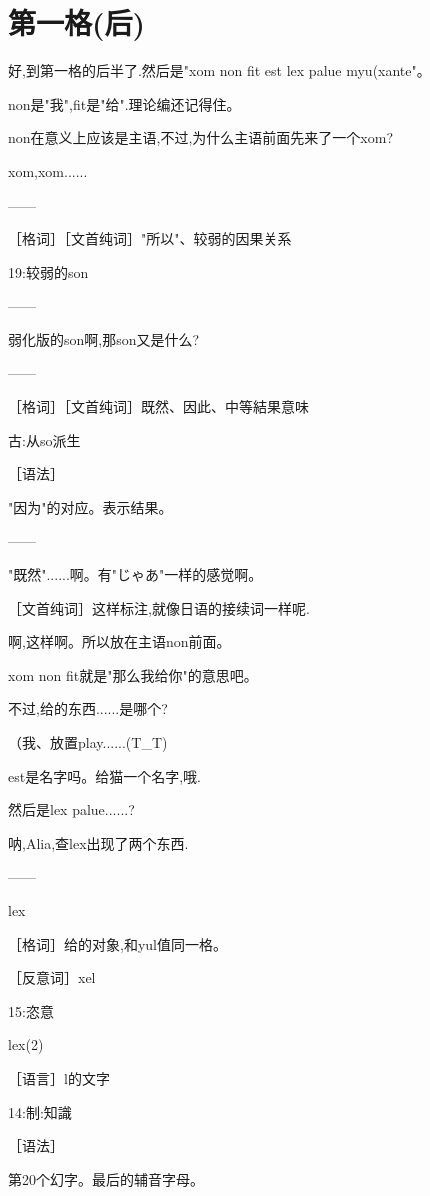\chapter{第一格(后)}


好,到第一格的后半了.然后是"xom non fit est lex palue myu(xante"。

non是"我",fit是"给".理论编还记得住。

non在意义上应该是主语,不过,为什么主语前面先来了一个xom?

xom,xom......

------

［格词］［文首纯词］"所以"、较弱的因果关系

19:较弱的son

------


弱化版的son啊,那son又是什么?

------

［格词］［文首纯词］既然、因此、中等結果意味

古:从so派生

［语法］

"因为"的对应。表示结果。


------


"既然"......啊。有"じゃあ"一样的感觉啊。

［文首纯词］这样标注,就像日语的接续词一样呢.

啊,这样啊。所以放在主语non前面。

xom non fit就是"那么我给你"的意思吧。

不过,给的东西......是哪个?



（我、放置play......(T\_{}T)


est是名字吗。给猫一个名字,哦.

然后是lex palue......?

呐,Alia,查lex出现了两个东西.

------

lex

［格词］给的对象,和yul值同一格。

［反意词］xel

15:恣意

lex(2)

［语言］l的文字

14:制:知識

［语法］

第20个幻字。最后的辅音字母。



